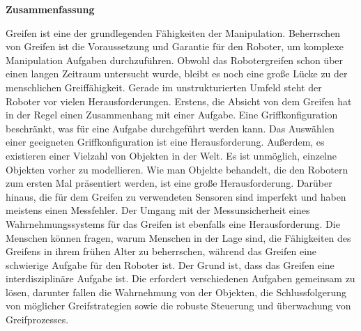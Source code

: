 \vspace{-3cm}
\noindent
\begin{center}
{\large \sffamily \textbf{Zusammenfassung}}
\end{center}
\noindent
\vspace{0.5cm}

%
Greifen ist eine der grundlegenden F\"ahigkeiten der Manipulation. Beherrschen von Greifen ist die Voraussetzung und Garantie f\"ur den Roboter, um komplexe Manipulation Aufgaben durchzuf\"uhren. Obwohl das Robotergreifen schon \"uber einen langen Zeitraum untersucht wurde, bleibt es noch eine gro{\ss}e L\"ucke zu der menschlichen Greiff\"ahigkeit. Gerade im unstrukturierten Umfeld steht der Roboter vor vielen Herausforderungen. Erstens, die Absicht von dem Greifen hat in der Regel einen Zusammenhang mit einer Aufgabe. Eine Griffkonfiguration beschr\"ankt, was f\"ur eine Aufgabe durchgef\"uhrt werden kann. Das Ausw\"ahlen einer geeigneten Griffkonfiguration ist eine Herausforderung. Au{\ss}erdem, es existieren einer Vielzahl von Objekten in der Welt. Es ist unm\"oglich, einzelne Objekten vorher zu modellieren. Wie man Objekte behandelt, die den Robotern zum ersten Mal pr\"asentiert werden, ist eine gro{\ss}e Herausforderung. Dar\"uber hinaus, die f\"ur dem Greifen zu verwendeten Sensoren sind imperfekt und haben meistens einen Messfehler. Der Umgang mit der Messunsicherheit eines Wahrnehmungssystems f\"ur das Greifen ist ebenfalls eine Herausforderung. Die Menschen k\"onnen fragen, warum Menschen in der Lage sind, die F\"ahigkeiten des Greifens in ihrem fr\"uhen Alter zu beherrschen, w\"ahrend das Greifen eine schwierige Aufgabe f\"ur den Roboter ist. Der Grund ist, dass das Greifen eine interdisziplin\"are Aufgabe ist. Die erfordert verschiedenen Aufgaben gemeinsam zu l\"osen, darunter fallen die Wahrnehmung von der Objekten, die Schlussfolgerung von m\"oglicher Greifstrategien sowie die robuste Steuerung und \"uberwachung von Greifprozesses.

